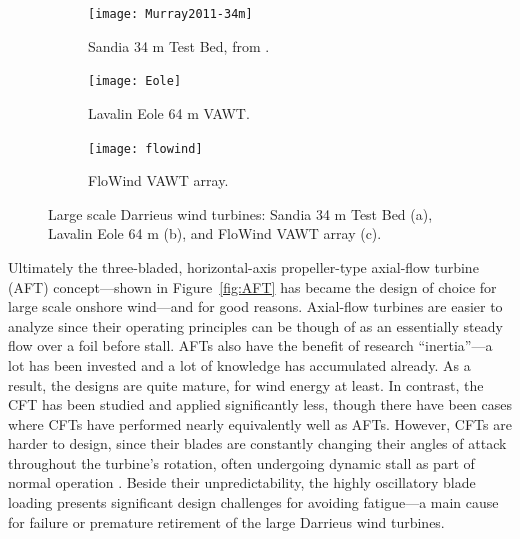 \begin{figure}
    \centering

    \begin{subfigure}[b]{0.58\textwidth}
        \centering
        
        \texttt{[image: Murray2011-34m]}
        
        \caption{Sandia 34 m Test Bed, from \cite{Murray2011}.}
        
        \label{fig:Sandia-34m}
    \end{subfigure}
    \hfill
    \begin{subfigure}[b]{0.365\textwidth}
        \centering
        
        \texttt{[image: Eole]}
        
        \caption{Lavalin Eole 64 m VAWT.}
        
        \label{fig:Eole}
    \end{subfigure}
    
    \begin{subfigure}[b]{0.8\textwidth}
        \centering
        
        \texttt{[image: flowind]}
        
        \caption{FloWind VAWT array.}
        
        \label{fig:FloWind}
    \end{subfigure}
    
    \caption{Large scale Darrieus wind turbines: Sandia 34 m Test Bed (a),
        Lavalin Eole 64 m (b), and FloWind VAWT array (c).}
    
    \label{fig:Darrieus}
\end{figure}


Ultimately the three-bladed, horizontal-axis propeller-type axial-flow turbine
(AFT) concept---shown in Figure~\ref{fig:AFT} has became the design of choice
for large scale onshore wind---and for good reasons. Axial-flow turbines are
easier to analyze since their operating principles can be though of as an
essentially steady flow over a foil before stall. AFTs also have the benefit of
research ``inertia''---a lot has been invested and a lot of knowledge has
accumulated already. As a result, the designs are quite mature, for wind energy
at least. In contrast, the CFT has been studied and applied significantly less,
though there have been cases where CFTs have performed nearly equivalently well
as AFTs. However, CFTs are harder to design, since their blades are constantly
changing their angles of attack throughout the turbine's rotation, often
undergoing dynamic stall as part of normal operation \cite{Para2002}. Beside
their unpredictability, the highly oscillatory blade loading presents
significant design challenges for avoiding fatigue---a main cause for failure or
premature retirement of the large Darrieus wind turbines.

